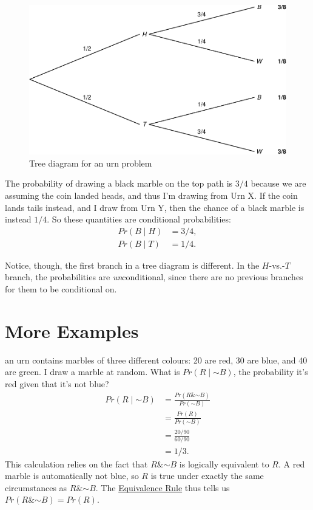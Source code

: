 \documentclass[justified]{tufte-book}
\newcommand{\given}{\mid}
\renewcommand{\neg}{\mathbin{\sim}}
\renewcommand{\wedge}{\mathbin{\&}}
\newcommand{\p}{Pr}
\theoremstyle{definition}
\theoremstyle{definition}
\theoremstyle{definition}
\theoremstyle{remark}
\begin{document}
\begin{figure}
\includegraphics{_main_files/figure-latex/unnamed-chunk-62-1} \caption[Tree diagram for an urn problem]{Tree diagram for an urn problem}\label{fig:unnamed-chunk-62}
\end{figure}

The probability of drawing a black marble on the top path is \(3/4\) because we are assuming the coin landed heads, and thus I'm drawing from Urn X. If the coin lands tails instead, and I draw from Urn Y, then the chance of a black marble is instead \(1/4\). So these quantities are conditional probabilities:
\[
  \begin{aligned}
    \p(B \given H) &= 3/4,\\
    \p(B \given T) &= 1/4.
  \end{aligned}
\]

Notice, though, the first branch in a tree diagram is different. In the \(H\)-vs.-\(T\) branch, the probabilities are \emph{un}conditional, since there are no previous branches for them to be conditional on.

\hypertarget{more-examples}{%
\section{More Examples}\label{more-examples}}

 an urn contains marbles of three different colours: 20 are red, 30 are blue, and 40 are green. I draw a marble at random. What is \(\p(R \given \neg B)\), the probability it's red given that it's not blue?
\[
  \begin{aligned}
    \p(R \given \neg B) &= \frac{\p(R \wedge \neg B)}{\p(\neg B)}\\
                        &= \frac{\p(R)}{\p(\neg B)}\\
                        &= \frac{20/90}{60/90}\\
                        &= 1/3.
  \end{aligned}
\]
This calculation relies on the fact that \(R \wedge \neg B\) is logically equivalent to \(R\). A red marble is automatically not blue, so \(R\) is true under exactly the same circumstances as \(R \wedge \neg B\). The \protect\hyperlink{tautologies-contradictions-and-equivalent-propositions}{Equivalence Rule} thus tells us \(\p(R \wedge \neg B) = \p(R)\).
\end{document}
